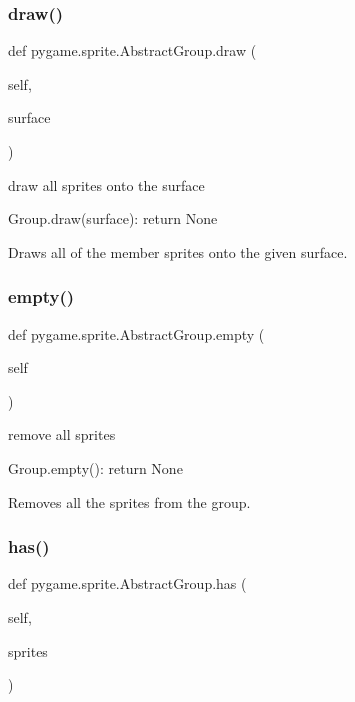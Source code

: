 \subsubsection{\texorpdfstring{draw()}{draw()}}
{\footnotesize\ttfamily def pygame.\+sprite.\+Abstract\+Group.\+draw (\begin{DoxyParamCaption}\item[{}]{self,  }\item[{}]{surface }\end{DoxyParamCaption})}

\begin{DoxyVerb}draw all sprites onto the surface

Group.draw(surface): return None

Draws all of the member sprites onto the given surface.\end{DoxyVerb}
 \mbox{\label{classpygame_1_1sprite_1_1_abstract_group_aad20dee3285d782816bfa1b20c56037b}} 
\subsubsection{\texorpdfstring{empty()}{empty()}}
{\footnotesize\ttfamily def pygame.\+sprite.\+Abstract\+Group.\+empty (\begin{DoxyParamCaption}\item[{}]{self }\end{DoxyParamCaption})}

\begin{DoxyVerb}remove all sprites

Group.empty(): return None

Removes all the sprites from the group.\end{DoxyVerb}
 \mbox{\label{classpygame_1_1sprite_1_1_abstract_group_aaa47245b13e7eaeb80d7428b1652ff93}} 
\subsubsection{\texorpdfstring{has()}{has()}}
{\footnotesize\ttfamily def pygame.\+sprite.\+Abstract\+Group.\+has (\begin{DoxyParamCaption}\item[{}]{self,  }\item[{}]{sprites }\end{DoxyParamCaption})}

